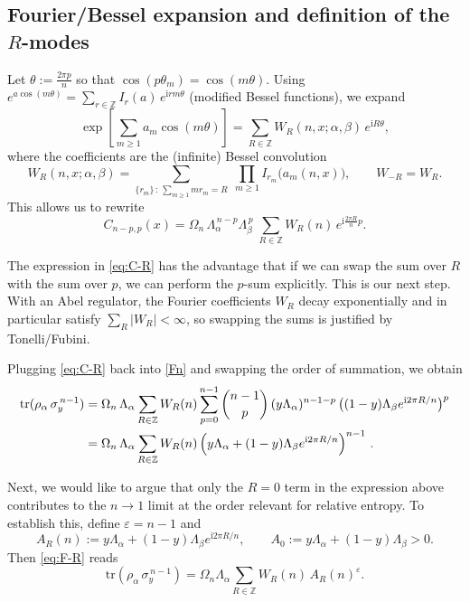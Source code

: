 \documentclass[11pt]{article}
\newcommand{\tr}{\mathrm{tr}}
\newcommand{\ii}{\mathrm{i}}
\newcommand{\eps}{\varepsilon}
\begin{document}
\subsection*{Fourier/Bessel expansion and definition of the $R$-modes}

Let $\theta:=\frac{2\pi p}{n}$ so that $\cos(p\theta_m)=\cos(m\theta)$.
Using $e^{a\cos(m\theta)}=\sum_{r\in\mathbb{Z}} I_r(a)\,e^{\ii r m\theta}$ (modified Bessel functions),
we expand
\begin{equation}
\exp\!\left[\sum_{m\ge 1} a_m\cos(m\theta)\right]
=\sum_{R\in\mathbb{Z}} W_R(n,x;\alpha,\beta)\,e^{\ii R\theta},
\label{eq:WR-Fourier}
\end{equation}
where the coefficients are the (infinite) Bessel convolution
\begin{equation}
W_R(n,x;\alpha,\beta)=
\sum_{\{r_m\}\,:\,\sum_{m\ge1} m r_m=R}\;\prod_{m\ge1} I_{r_m}\!\big(a_m(n,x)\big),
\qquad
W_{-R}=W_R.
\label{eq:WR-def}
\end{equation}
This allows us to rewrite
\begin{equation}
C_{n-p,p}(x)
=\Omega_n\,\Lambda_\alpha^{\,n-p}\Lambda_\beta^{\,p}\;
\sum_{R\in\mathbb{Z}} W_R(n)\,e^{\ii \frac{2\pi R}{n}p}.
\label{eq:C-R}
\end{equation}

The expression in \eqref{eq:C-R} has the advantage that if we can swap the sum over $R$ with the sum over $p$, we can perform the $p$-sum explicitly. This is our next step. With an Abel regulator, the Fourier coefficients $W_R$ decay exponentially and in particular satisfy $\sum_R |W_R|<\infty$, so swapping the sums is justified by Tonelli/Fubini.

Plugging \eqref{eq:C-R} back into \eqref{Fn} and swapping the order of summation, we obtain
\begin{align}
\tr(\rho_\alpha\,\sigma_y^{\,n-1})
&=\Omega_n\,\Lambda_\alpha\sum_{R\in\mathbb{Z}}W_R(n)
\sum_{p=0}^{n-1}\binom{n-1}{p}\,
(y\Lambda_\alpha)^{n-1-p}\,
\bigl((1-y)\Lambda_\beta e^{\ii2\pi R/n}\bigr)^{p}
\nonumber\\
&=
\Omega_n\,\Lambda_\alpha\sum_{R\in\mathbb{Z}}W_R(n)\,
\Bigl(y\Lambda_\alpha+(1-y)\Lambda_\beta e^{\ii2\pi R/n}\Bigr)^{n-1}\ .
\label{eq:F-R}
\end{align}

Next, we would like to argue that only the $R=0$ term in the expression above contributes to the $n\to 1$ limit at the order relevant for relative entropy.
To establish this, define $\eps=n-1$ and
\begin{equation}
A_R(n):=y\Lambda_\alpha+(1-y)\Lambda_\beta e^{\ii2\pi R/n},\qquad A_0:=y\Lambda_\alpha+(1-y)\Lambda_\beta>0.
\end{equation}
Then \eqref{eq:F-R} reads
\begin{equation}
\tr(\rho_\alpha\,\sigma_y^{\,n-1})=\Omega_n\Lambda_\alpha\sum_{R\in\mathbb{Z}}W_R(n)\,A_R(n)^{\eps}.
\label{eq:F-eps}
\end{equation}
\end{document}
